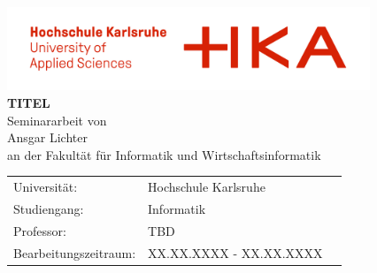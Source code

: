 \begin{titlepage}
	\thispagestyle{empty}
	
	\begin{center}
		\includegraphics[height=2.5cm]{logos/HKA_Logo.png}\\[16ex]
		\huge{\textbf{TITEL}}\\[8ex]
		\large{Seminararbeit von}\\
		\large{Ansgar Lichter}\\[4ex]
		an der Fakult\"at f\"ur Informatik und Wirtschaftsinformatik\\[8ex]

		\begin{tabular}{lll}
			Universität:             & \quad Hochschule Karlsruhe     &       \\[2ex]
			Studiengang:             & \quad Informatik      &       \\[2ex]
			Professor:             & \quad TBD      &       \\[2ex]
			Bearbeitungszeitraum:      & \quad XX.XX.XXXX - XX.XX.XXXX                                  &       \\[2ex]
		\end{tabular}
	\end{center}
\end{titlepage}
